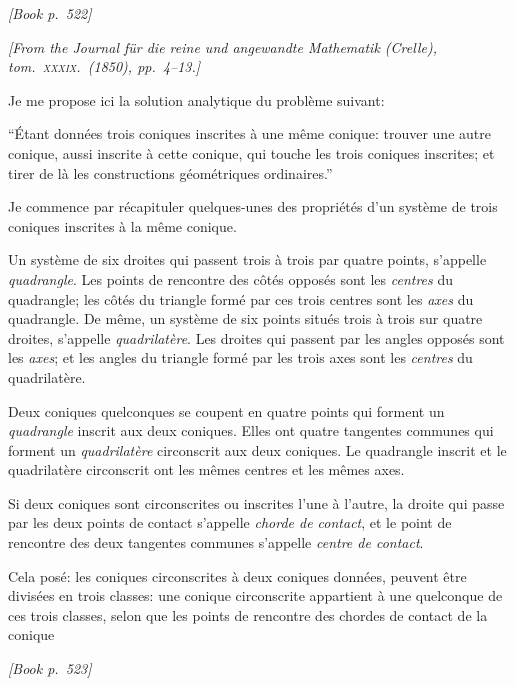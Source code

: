 \documentclass[11pt]{article}
\begin{document}
\noindent\textit{[Book p.~522]}\hfill

\smallskip

\noindent\emph{[From the Journal f\"ur die reine und angewandte Mathematik (Crelle), tom.~\textsc{xxxix}.\ (1850), pp.~4--13.]}

\medskip

\noindent Je me propose ici la solution analytique du probl\`eme suivant:

``\'Etant donn\'ees trois coniques inscrites \`a une m\^eme conique: trouver une autre conique, aussi inscrite \`a cette conique, qui touche les trois coniques inscrites; et tirer de l\`a les constructions g\'eom\'etriques ordinaires.''

\medskip

Je commence par r\'ecapituler quelques-unes des propri\'et\'es d'un syst\`eme de trois coniques inscrites \`a la m\^eme conique.

\medskip

Un syst\`eme de six droites qui passent trois \`a trois par quatre points, s'appelle \emph{quadrangle}. Les points de rencontre des c\^ot\'es oppos\'es sont les \emph{centres} du quadrangle; les c\^ot\'es du triangle form\'e par ces trois centres sont les \emph{axes} du quadrangle. De m\^eme, un syst\`eme de six points situ\'es trois \`a trois sur quatre droites, s'appelle \emph{quadrilat\`ere}. Les droites qui passent par les angles oppos\'es sont les \emph{axes}; et les angles du triangle form\'e par les trois axes sont les \emph{centres} du quadrilat\`ere.

Deux coniques quelconques se coupent en quatre points qui forment un \emph{quadrangle} inscrit aux deux coniques. Elles ont quatre tangentes communes qui forment un \emph{quadrilat\`ere} circonscrit aux deux coniques. Le quadrangle inscrit et le quadrilat\`ere circonscrit ont les m\^emes centres et les m\^emes axes.

Si deux coniques sont circonscrites ou inscrites l'une \`a l'autre, la droite qui passe par les deux points de contact s'appelle \emph{chorde de contact}, et le point de rencontre des deux tangentes communes s'appelle \emph{centre de contact}.

Cela pos\'e: les coniques circonscrites \`a deux coniques donn\'ees, peuvent \^etre divis\'ees en trois classes: une conique circonscrite appartient \`a une quelconque de ces trois classes, selon que les points de rencontre des chordes de contact de la conique

\medskip
\noindent\textit{[Book p.~523]}\hfill
\end{document}
